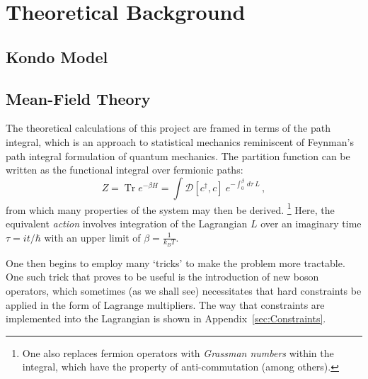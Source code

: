 \documentclass[12pt]{article}
\DeclareMathOperator{\Tr}{Tr}
\begin{document}


\section{Theoretical Background} %

\subsection{Kondo Model}



\subsection{Mean-Field Theory}

The theoretical calculations of this project are framed in terms of the path integral, which is an approach to statistical mechanics reminiscent of Feynman's path integral formulation of quantum mechanics. The partition function can be written as the functional integral over fermionic paths: $$ Z = \Tr{e^{- \beta H}} = \int \mathcal{D} [c^\dagger, c]~e^{-\int_{0}^{\beta} \,d\tau~L}\,, $$ from which many properties of the system may then be derived. \footnote{One also replaces fermion operators with \emph{Grassman numbers} within the integral, which have the property of anti-commutation (among others).} Here, the equivalent \emph{action} involves integration of the Lagrangian $ L $ over an imaginary time $ \tau = i t / \hbar $ with an upper limit of $ \beta = \frac{1}{k_B T} $.

One then begins to employ many `tricks' to make the problem more tractable. One such trick that proves to be useful is the introduction of new boson operators, which sometimes (as we shall see) necessitates that hard constraints be applied in the form of Lagrange multipliers. The way that constraints are implemented into the Lagrangian is shown in Appendix~\ref{sec:Constraints}.
\end{document}
